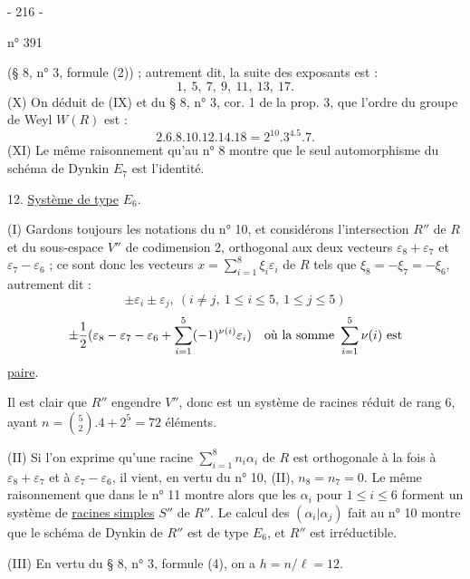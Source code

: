 \begin{center}- 216 -\end{center}
\hfill n° 391

(§ 8, n° 3, formule (2)) ; autrement dit, la suite des exposants est :
\[
1,\ 5,\ 7,\ 9,\ 11,\ 13,\ 17.
\]
(X) On déduit de (IX) et du § 8, n° 3, cor. 1 de la prop. 3, que l'ordre du groupe de Weyl $W(R)$ est :
\[
2.6.8.10.12.14.18=2^{10}.3^4.5.7.
\]
(XI) Le même raisonnement qu'au n° 8 montre que le seul automorphisme du schéma de Dynkin $E_7$ est l'identité.

12. \uline{Système de type} $E_6$.

(I) Gardons toujours les notations du n° 10, et considérons l'intersection $R''$ de $R$ et du sous-espace $V''$ de codimension 2, orthogonal aux deux vecteurs $\varepsilon_8+\varepsilon_7$ et $\varepsilon_7-\varepsilon_6$ ; ce sont donc les vecteurs $x=\sum_{i=1}^8\xi_i\varepsilon_i$ de $R$ tels que $\xi_8=-\xi_7=-\xi_6$, autrement dit :
\[
\pm\varepsilon_i\pm\varepsilon_j,\ (i\ne j,\ 1\leq i\leq5,\ 1\leq j\leq5)
\]
\[
\pm\frac12(\varepsilon_8-\varepsilon_7-\varepsilon_6+\sum_{i=1}^5(-1)^{\relax{\nu(i)}}\varepsilon_i)\quad\text{où la somme }\sum_{i=1}^5\relax{\nu(i)}\text{ est}
\]
\uline{paire}.

Il est clair que $R''$ engendre $V''$, donc est un système de racines réduit de rang 6, ayant $n=\binom52.4+2^5=72$ éléments.

(II) Si l'on exprime qu'une racine $\sum_{i=1}^8n_i\alpha_i$ de $R$ est orthogonale à la fois à $\varepsilon_8+\varepsilon_7$ et à $\varepsilon_7-\varepsilon_6$, il vient, en vertu du n° 10, (II), $n_8=n_7=0$. Le même raisonnement que dans le n° 11 montre alors que les $\alpha_i$ pour $1\leq i\leq6$ forment un système de \uline{racines simples} $S''$ de $R''$. Le calcul des $(\alpha_i|\alpha_j)$ fait au n° 10 montre que le schéma de Dynkin de $R''$ est de type $E_6$, et $R''$ est irréductible.

(III) En vertu du § 8, n° 3, formule (4), on a $h=n/\ell=12$.
